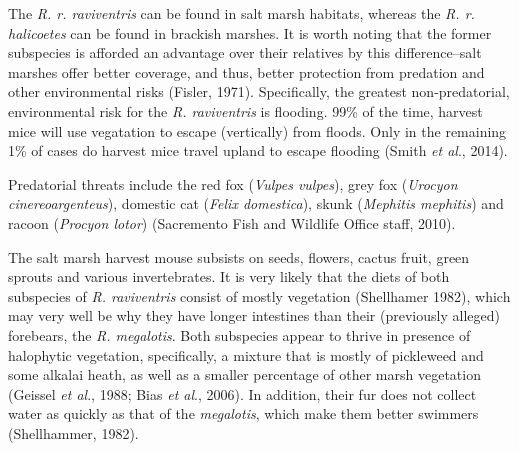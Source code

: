 \documentclass[a4paper]{article}
\begin{document}
The \textit{R. r. raviventris} can be found in salt marsh habitats, whereas the \textit{R. r. halicoetes} can be found in brackish marshes. It is worth noting that the former subspecies is afforded an advantage over their relatives by this difference--salt marshes offer better coverage, and thus, better protection from predation and other environmental risks (Fisler, 1971). Specifically, the greatest non-predatorial, environmental risk for the \textit{R. raviventris} is flooding. 99\% of the time, harvest mice will use vegatation to escape (vertically) from floods. Only in the remaining 1\% of cases do harvest mice travel upland to escape flooding (Smith \textit{et al}., 2014).

Predatorial threats include the red fox (\textit{Vulpes vulpes}), grey fox (\textit{Urocyon cinereoargenteus}), domestic cat (\textit{Felix domestica}), skunk (\textit{Mephitis mephitis}) and racoon (\textit{Procyon lotor}) (Sacremento Fish and Wildlife Office staff, 2010).

The salt marsh harvest mouse subsists on seeds, flowers, cactus fruit, green sprouts and various invertebrates. It is very likely that the diets of both subspecies of \textit{R. raviventris} consist of mostly vegetation (Shellhamer 1982), which may very well be why they have longer intestines than their (previously alleged) forebears, the \textit{R. megalotis}. Both subspecies appear to thrive in presence of halophytic vegetation, specifically, a mixture that is mostly of pickleweed and some alkalai heath, as well as a smaller percentage of other marsh vegetation (Geissel \textit{et al}., 1988; Bias \textit{et al}., 2006). In addition, their fur does not collect water as quickly as that of the \textit{megalotis}, which make them better swimmers (Shellhammer, 1982).
\end{document}
